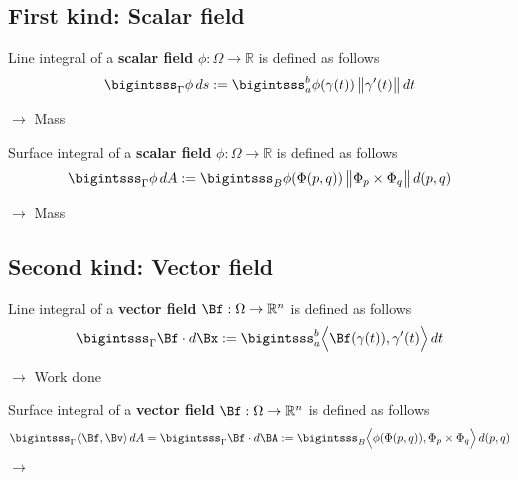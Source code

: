 \documentclass[12pt]{article}
\begin{document}
\subsection{First kind: Scalar field}
\begin{recallboxed}
	\label{recall:scalar}
	Line integral of a 
	\textbf{scalar field} $\phi: \Omega \to \mathbb{R}$ is defined as follows
	\begin{align}
		\bigintsss_{\Gamma} \phi \, ds 
		:= \bigintsss_{a}^{b} \phi(\gamma(t))  \, \big\| \gamma'(t) \big\| \, dt
	\end{align}
\end{recallboxed}
$\rightarrow$ Mass
\begin{recallboxed}
	\label{recall:scalarsurface}
	Surface integral of a 
	\textbf{scalar field} $\phi: \Omega \to \mathbb{R}$ is defined as follows
	\begin{align}
		\bigintsss_{\Gamma} \phi \, dA 
		:= \bigintsss_{B} \phi(\Phi(p,q)) \, \big\| \Phi_p \times \Phi_q \big\| \, d(p,q)
	\end{align}
\end{recallboxed}
$\rightarrow$ Mass
\subsection{Second kind: Vector field}
\begin{recallboxed}
	\label{recall:vectorsurface}
	Line integral of a \textbf{vector field} $\Bf: \Omega \to \mathbb{R}^{n}$ is defined as follows
	\begin{align}
		\bigintsss_{\Gamma} \Bf \cdot d\Bx 
		:= \bigintsss_{a}^{b}
		\Big\langle \Bf(\gamma(t)), \gamma'(t) \Big\rangle \, dt
	\end{align}
\end{recallboxed}
$\rightarrow$ Work done
\begin{recallboxed}
	\label{recall:vector}
	Surface integral of a \textbf{vector field} $\Bf: \Omega \to \mathbb{R}^{n}$ is defined as follows
	\begin{align}
		\bigintsss_{\Gamma} \langle \Bf, \Bv \rangle \, dA 
		= \bigintsss_{\Gamma} \Bf \cdot d\BA
		:= \bigintsss_{B}
		\Big\langle 
		\phi(\Phi(p,q)), \Phi_p \times \Phi_q
		\Big\rangle
		\, d(p,q)
	\end{align}
\end{recallboxed}
$\rightarrow$
\clearpage
\end{document}
